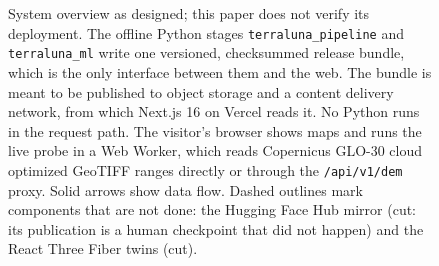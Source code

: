 \begin{figure}[tbp]
\caption{System overview as designed; this paper does not verify its deployment. The offline Python stages \texttt{terraluna\_pipeline} and \texttt{terraluna\_ml} write one versioned, checksummed release bundle, which is the only interface between them and the web. The bundle is meant to be published to object storage and a content delivery network, from which Next.js 16 on Vercel reads it. No Python runs in the request path. The visitor's browser shows maps and runs the live probe in a Web Worker, which reads Copernicus GLO-30 cloud optimized GeoTIFF ranges directly or through the \texttt{/api/v1/dem} proxy. Solid arrows show data flow. Dashed outlines mark components that are not done: the Hugging Face Hub mirror (cut: its publication is a human checkpoint that did not happen) and the React Three Fiber twins (cut).}
\label{fig:system-overview}
\end{figure}
